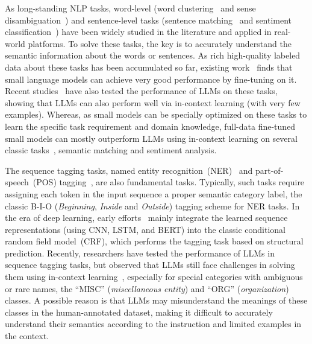 As long-standing NLP tasks, word-level (\eg word clustering~\cite{Martin-Speech-1998-clustering} and sense disambiguation~\cite{Navigli-ACM-2009-disambiguation}) and sentence-level tasks (sentence matching~\cite{Gomaa-International-2013-similarity} and sentiment classification~\cite{Minaee-ACM-2021-classification}) have been widely studied in the literature and applied in real-world platforms. 
To solve these tasks, the key is to accurately understand the semantic information about the words or sentences.
As rich high-quality labeled data about these tasks has been accumulated so far, existing work~\cite{qiu-CoRR-2020-PTM,Devlin-NAACL-2019-BERT} finds that small language models can achieve very good performance by fine-tuning on it.
Recent studies~\cite{Brown-NeurIPS-2020-Language,Alex-NIPS-2021-RAFT} have also tested the performance of LLMs on these tasks, showing that LLMs can also perform well via in-context learning (with very few examples).   
Whereas,  {as small models can be specially optimized on these tasks to learn the specific task requirement  and domain knowledge}, full-data fine-tuned small models can mostly outperform LLMs using in-context learning on several classic tasks~\cite{Qin-arxiv-2023-Is,Chen-arxiv-2023-Robust}, \eg semantic matching and sentiment analysis. 



The sequence tagging tasks, \eg named entity recognition~(NER)~\cite{Nadeau-Lingvisticae-2007-NER} and part-of-speech~(POS) tagging~\cite{Ratnaparkhi-EMNLP-1996-maximum}, are also fundamental tasks. 
Typically, such tasks require assigning each token in the input sequence a proper semantic category label, \eg the classic B-I-O (\emph{Beginning}, \emph{Inside} and \emph{Outside}) tagging scheme for NER tasks.
In the era of deep learning, early efforts~\cite{Yadav-COLING-2018-survey,Souza-arxiv-2019-portuguese} mainly integrate the learned sequence representations (\eg using CNN, LSTM, and BERT) into the classic conditional random field model~(CRF), which performs the tagging task based on structural  prediction.
Recently, researchers have tested the performance of  LLMs in sequence tagging tasks, but observed that LLMs still face challenges in solving them using in-context learning~\cite{Qin-arxiv-2023-Is}, especially for special categories with ambiguous or rare names, \eg the ``MISC'' (\emph{miscellaneous entity}) and ``ORG'' (\emph{organization}) classes.
A possible reason is that LLMs may misunderstand the meanings of these classes in the human-annotated dataset, making it difficult to accurately  understand their semantics according to the instruction and limited examples in the context.


